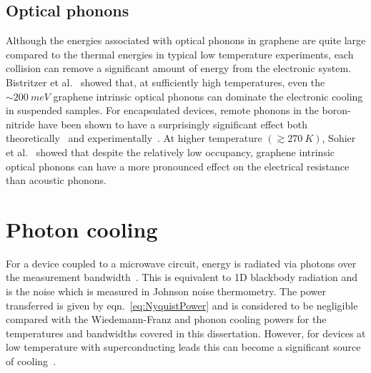 \subsection{Optical phonons}

Although the energies associated with optical phonons in graphene are quite large compared to the thermal energies in typical low temperature experiments, each collision can remove a significant amount of energy from the electronic system. Bistritzer et al.~\cite{bistritzer_electronic_2009} showed that, at sufficiently high temperatures, even the ${\sim}200~meV$ graphene intrinsic optical phonons can dominate the electronic cooling in suspended samples. For encapsulated devices, remote phonons in the boron-nitride have been shown to have a surprisingly significant effect both theoretically~\cite{viljas_electron-phonon_2010, bistritzer_electronic_2009, low_cooling_2012} and experimentally~\cite{tielrooij_out--plane_2017}. At higher temperature $\left( \gtrsim 270~K\right)$, Sohier et al.~\cite{sohier_phonon-limited_2014} showed that despite the relatively low occupancy, graphene intrinsic optical phonons can have a more pronounced effect on the electrical resistance than acoustic phonons.

\section{Photon cooling}
For a device coupled to a microwave circuit, energy is radiated via photons over the measurement bandwidth~\cite{schmidt_photon-mediated_2004, mckitterick_prospects_2015}. This is equivalent to 1D blackbody radiation and is the noise which is measured in Johnson noise thermometry. The power transferred is given by eqn.~\ref{eq:NyquistPower} and is considered to be negligible compared with the Wiedemann-Franz and phonon cooling powers for the temperatures and bandwidths covered in this dissertation. However, for devices at low temperature with superconducting leads this can become a significant source of cooling~\cite{mckitterick_prospects_2015}.

